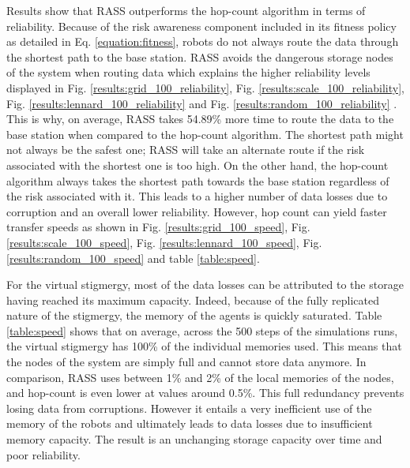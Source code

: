 \documentclass[runningheads]{llncs}
\begin{document}
Results show that RASS outperforms the hop-count algorithm in terms of reliability. Because 
of the risk awareness component included in its fitness policy as detailed in Eq. 
\ref{equation:fitness}, robots do not always route the data through the shortest path to 
the base station. RASS avoids the dangerous storage nodes of the system when routing data 
which explains the higher reliability levels displayed in Fig. 
\ref{results:grid_100_reliability}, Fig. \ref{results:scale_100_reliability}, Fig. 
\ref{results:lennard_100_reliability} and Fig. \ref{results:random_100_reliability} . This 
is why, on average, RASS takes 54.89\% more time to route the data to the base station when 
compared to the hop-count algorithm. The shortest path might not always be the safest one; 
RASS will take an alternate route if the risk associated with the shortest one is too high. 
On the other hand, the hop-count algorithm always takes the shortest path towards the base 
station regardless of the risk associated with it. This leads to a higher number of data 
losses due to corruption and an overall lower reliability.
However, hop count can yield faster transfer speeds as shown in Fig. \ref{results:grid_100_speed}, Fig. \ref{results:scale_100_speed}, Fig. \ref{results:lennard_100_speed}, Fig. \ref{results:random_100_speed} and table \ref{table:speed}.


For the virtual stigmergy, most of the data losses can be attributed to the storage having reached its maximum capacity. Indeed, because of the fully replicated nature of the stigmergy, the memory of the agents is quickly saturated. Table \ref{table:speed} shows that on average, across the 500 steps of the simulations runs, the virtual stigmergy has 100\% of the individual memories used. This means that the nodes of the system are simply full and cannot store data anymore. In comparison, RASS uses between 1\% and 2\% of the local memories of the nodes, and hop-count is even lower at values around 0.5\%. This full redundancy prevents losing data from corruptions. However it entails a very inefficient use of the memory of the robots and ultimately leads to data losses due to insufficient memory capacity. The result is an unchanging storage capacity over time and poor reliability.
\end{document}

